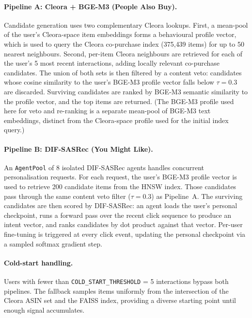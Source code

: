 \paragraph{Pipeline A: Cleora + BGE-M3 (People Also Buy).}
Candidate generation uses two complementary Cleora lookups.
First, a mean-pool of the user's Cleora-space item embeddings forms a behavioural profile vector, which is used to query the Cleora co-purchase index (375{,}439 items) for up to 50 nearest neighbours.
Second, per-item Cleora neighbours are retrieved for each of the user's 5 most recent interactions, adding locally relevant co-purchase candidates.
The union of both sets is then filtered by a content veto: candidates whose cosine similarity to the user's BGE-M3 profile vector falls below $\tau = 0.3$ are discarded.
Surviving candidates are ranked by BGE-M3 semantic similarity to the profile vector, and the top items are returned.
(The BGE-M3 profile used here for veto and re-ranking is a separate mean-pool of BGE-M3 text embeddings, distinct from the Cleora-space profile used for the initial index query.)

\paragraph{Pipeline B: DIF-SASRec (You Might Like).}
An \texttt{AgentPool} of 8 isolated DIF-SASRec agents handles concurrent personalisation requests.
For each request, the user's BGE-M3 profile vector is used to retrieve 200 candidate items from the HNSW index.
Those candidates pass through the same content veto filter ($\tau = 0.3$) as Pipeline~A.
The surviving candidates are then scored by DIF-SASRec: an agent loads the user's personal checkpoint, runs a forward pass over the recent click sequence to produce an intent vector, and ranks candidates by dot product against that vector.
Per-user fine-tuning is triggered at every click event, updating the personal checkpoint via a sampled softmax gradient step.

\paragraph{Cold-start handling.}
Users with fewer than \texttt{COLD\_START\_THRESHOLD} = 5 interactions bypass both pipelines.
The fallback samples items uniformly from the intersection of the Cleora ASIN set and the FAISS index, providing a diverse starting point until enough signal accumulates.

